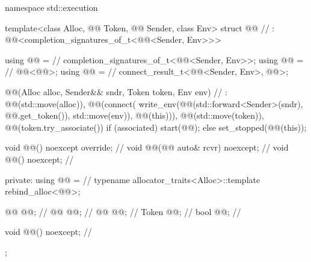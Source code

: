 %
\begin{codeblock}
namespace std::execution {
  template<class Alloc, @@ Token, @@ Sender, class Env>
  struct @@                                                 // \expos
    : @@<completion_signatures_of_t<@@<Sender, Env>>> {
    using @@ =                                                          // \expos
      completion_signatures_of_t<@@<Sender, Env>>;
    using @@ =                                                      // \expos
      @@<@@>;
    using @@ =                                                            // \expos
      connect_result_t<@@<Sender, Env>, @@>;

    @@(Alloc alloc, Sender&& sndr, Token token, Env env)    // \expos
      : @@(std::move(alloc)),
        @@(connect(
          write_env(@@(std::forward<Sender>(sndr), @@.get_token()), std::move(env)),
          @@(this))),
        @@(std::move(token)),
        @@(token.try_associate()) {
          if (associated)
            start(@@);
          else
            set_stopped(@@(this));
        }

    void @@() noexcept override;                                      // \expos
    void @@(@@ auto& rcvr) noexcept;                             // \expos
    void @@() noexcept;                                                // \expos

  private:
    using @@ =                                                         // \expos
      typename allocator_traits<Alloc>::template rebind_alloc<@@>;

    @@ @@;                                                          // \expos
    @@ @@;                                                      // \expos
    @@ @@;                                                                // \expos
    Token @@;                                                            // \expos
    bool @@;                                                        // \expos

    void @@() noexcept;                                                // \expos
  };
}
\end{codeblock}

